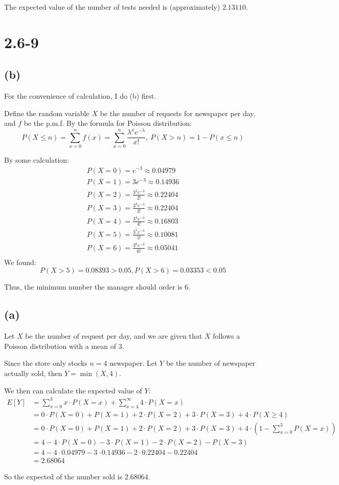 \documentclass[12pt]{article}
\theoremstyle{definition}
\theoremstyle{remark}
\begin{document}
The expected value of the number of tests needed is (approximately) $2.13110$.
\newpage
\section*{2.6-9}
\subsection*{(b)}
For the convenience of calculation, I do (b) first.

Define the random variable $X$ be the number of requests for newspaper per day, and $f$ be the p.m.f. By the formula for Poisson distribution:
\[P(X\le n)=\displaystyle{\sum^n_{x=0}f(x)=\sum^n_{x=0}\frac{\lambda^x e^{-\lambda}}{x!}},\ P(X>n)=1-P(x\le n)\] 

By some calculation:
\begin{align*}
    P(X=0)=e^{-3}\approx 0.04979 \\
    P(X=1)=3e^{-3}\approx 0.14936 \\
    P(X=2)=\frac{3^2e^{-3}}{2!}\approx 0.22404 \\
    P(X=3)=\frac{3^3e^{-3}}{3!}\approx 0.22404 \\
    P(X=4)=\frac{3^4e^{-3}}{4!}\approx 0.16803 \\
    P(X=5)=\frac{3^5e^{-3}}{5!}\approx 0.10081 \\
    P(X=6)=\frac{3^6e^{-3}}{6!}\approx 0.05041 \\
\end{align*}
We found:
\[P(X>5)=0.08393>0.05,P(X>6)=0.03353<0.05\]

Thus, the minimum number the manager should order is $6$.
\subsection*{(a)}
Let $X$ be the number of request per day, and we are given that $X$ follows a Poisson distribution with a mean of $3$.

Since the store only stocks $n=4$ newspaper. Let $Y$ be the number of newspaper actually sold, then $Y=\min(X,4)$.

We then can calculate the expected value of $Y$:
\begin{align*}
    E[Y]&=\displaystyle{\sum^3_{x=0}x\cdot P(X=x)+\sum^\infty_{x=4}4\cdot P(X=x)} \\
        &=0\cdot P(X=0)+P(X=1)+2\cdot P(X=2)+3\cdot P(X=3)+4\cdot P(X\ge 4) \\
        &=0\cdot P(X=0)+P(X=1)+2\cdot P(X=2)+3\cdot P(X=3)+4\cdot (1-\displaystyle{\sum^3_{x=0}P(X=x)}) \\
        &=4-4\cdot P(X=0)-3\cdot P(X=1)-2\cdot P(X=2)-P(X=3) \\
        &=4-4\cdot 0.04979-3\cdot 0.14936-2\cdot 0.22404-0.22404 \\
        &=2.68064
\end{align*}

So the expected of the number sold is $2.68064$.
\end{document}
